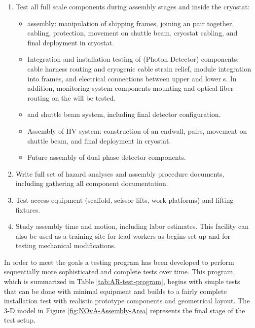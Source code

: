 \begin{enumerate}
\item Test all full scale  components during assembly stages and inside the cryostat:  
\begin{itemize}
    \item {}  assembly: manipulation of  shipping frames, joining an  pair together,  cabling,  protection, movement on shuttle beam, cryostat cabling, and final deployment in cryostat. 
    \item Integration and installation testing of  (Photon Detector) components: cable harness routing and cryogenic cable strain relief, module integration into  frames, and electrical connections between upper and lower s.  In addition,  monitoring system components mounting and optical fiber routing on the  will be tested.
    \item {} and shuttle beam system, including final detector configuration.
    \item Assembly of HV system: construction of an endwall,  pairs, movement on shuttle beam, and final deployment in cryostat.
    \item Future assembly of dual phase detector components.
\end{itemize}
\item Write full set of hazard analyses and assembly procedure documents, including gathering all component documentation. 
\item Test access equipment (scaffold, scissor lifts, work platforms) and lifting fixtures. 
\item Study assembly time and motion, including labor estimates. This facility can also be used as a training site for lead workers as  begins set up and for testing mechanical modifications.
\end{enumerate}

In order to meet the goals a testing program has been developed to perform sequentially more sophisticated and complete tests over time. 
This program, which is summarized in Table \ref{tab:AR-test-program}, begins with simple tests that can be done with minimal equipment and builds to a fairly complete installation test with realistic prototype components and geometrical layout. 
The 3-D model in Figure \ref{fig:NOvA-Assembly-Area} represents the final stage of the test setup.

